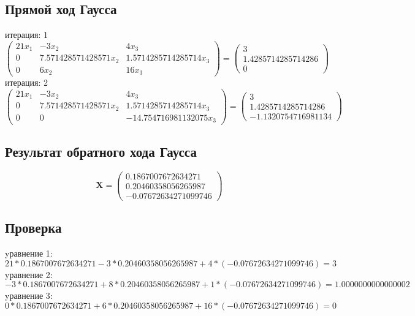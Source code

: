 \documentclass{article}
\begin{document}
\subsection{Прямой ход Гаусса}
итерация: 1
\begin{displaymath}
\left(
  \begin{array}{ccc}
    21 x_{1} & -3 x_{2} & 4 x_{3} \\
    0 & 7.571428571428571 x_{2} & 1.5714285714285714 x_{3} \\
    0 & 6 x_{2} & 16 x_{3}
  \end{array}
\right)
=
\left(
  \begin{array}{ccc}
    3\\
    1.4285714285714286\\
    0
  \end{array}
\right)
\end{displaymath}
итерация: 2
\begin{displaymath}
\left(
  \begin{array}{ccc}
    21 x_{1} & -3 x_{2} & 4 x_{3} \\
    0 & 7.571428571428571 x_{2} & 1.5714285714285714 x_{3} \\
    0 & 0 & -14.754716981132075 x_{3}
  \end{array}
\right)
=
\left(
  \begin{array}{ccc}
    3\\
    1.4285714285714286\\
    -1.1320754716981134
  \end{array}
\right)
\end{displaymath}

\subsection{Результат обратного хода Гаусса}
\begin{displaymath}
\mathbf{X} =
\left( \begin{array}{ccc}
  0.1867007672634271 \\
  0.20460358056265987 \\
  -0.07672634271099746 
\end{array} \right)
\end{displaymath}

\subsection{Проверка}
yравнение 1:
\begin{displaymath}
  21 * 0.1867007672634271 -3*0.20460358056265987 + 4 * (-0.07672634271099746) = 3
\end{displaymath}
yравнение 2:
\begin{displaymath}
  -3 * 0.1867007672634271 + 8*0.20460358056265987 + 1 * (-0.07672634271099746) = 1.0000000000000002
\end{displaymath}
yравнение 3:
\begin{displaymath}
  0*0.1867007672634271 + 6*0.20460358056265987 + 16 * (-0.07672634271099746) = 0
\end{displaymath}
\end{document}
